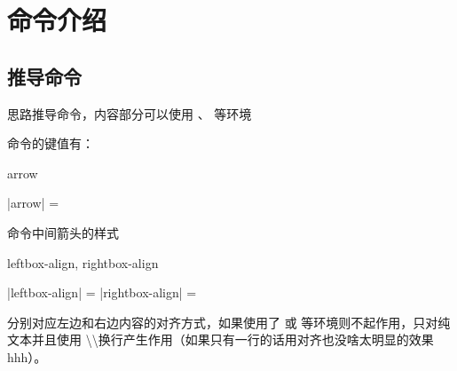 \documentclass{xdyy-usermanual}
\begin{document}
\section{命令介绍}


\subsection{推导命令  }

\begin{function}[added = 2022-1-12]{\deduce}
  \begin{syntax}
       
  \end{syntax}
  思路推导命令，内容部分可以使用 、 等环境
  \begin{hexample}
  \end{hexample}
\end{function}

 命令的键值有：

\begin{function}[added = 2022-01-12]{arrow}
  \begin{syntax}
    |arrow| =  \init{$\Longrightarrow$}
  \end{syntax}
  命令中间箭头的样式
\end{function}

\begin{function}[added = 2022-01-12]{leftbox-align, rightbox-align}
  \begin{syntax}
    |leftbox-align| =  
    |rightbox-align| =  
  \end{syntax}
  分别对应左边和右边内容的对齐方式，如果使用了  或  等环境则不起作用，只对纯文本并且使用 \textbackslash \textbackslash 换行产生作用（如果只有一行的话用对齐也没啥太明显的效果hhh）。
\end{function}
\end{document}
